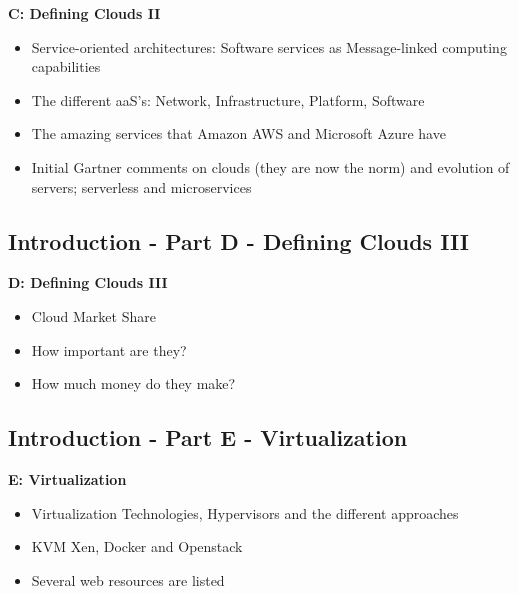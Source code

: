 
\textbf{C: Defining Clouds II}

\begin{itemize}
\item Service-oriented architectures: Software services as
  Message-linked computing capabilities
\item The different aaS’s: Network, Infrastructure, Platform, Software
\item The amazing services that Amazon AWS and Microsoft Azure have
\item Initial Gartner comments on clouds (they are now the norm) and
  evolution of servers; serverless and microservices

\end{itemize}

\subsection{Introduction - Part D - Defining Clouds III}\label{s:cloud-fundamentals-d}



\textbf{D: Defining Clouds III}
\begin{itemize}
\item Cloud Market Share
\item How important are they?
\item How much money do they make?
\end{itemize}

\subsection{Introduction - Part E - Virtualization}\label{s:cloud-fundamentals-e}

\textbf{E: Virtualization}
\begin{itemize}
\item Virtualization Technologies, Hypervisors and the different
  approaches
\item KVM Xen, Docker and Openstack
\item Several web resources are listed
\end{itemize}

